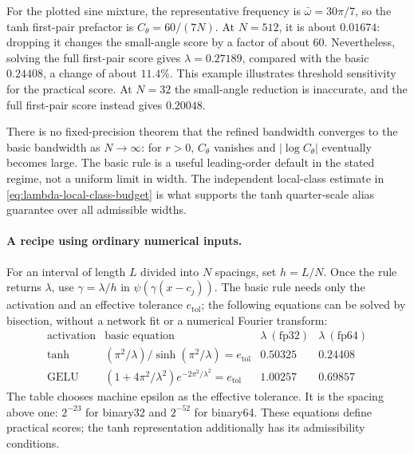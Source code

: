\documentclass[11pt]{article}
\begin{document}
For the plotted sine mixture, the representative frequency is
$\bar\omega=30\pi/7$, so the tanh first-pair prefactor is
$C_\theta=60/(7N)$. At $N=512$, it is about $0.01674$: dropping it
changes the small-angle score by a factor of about $60$. Nevertheless,
solving the full first-pair score gives $\lambda=0.27189$, compared with
the basic $0.24408$, a change of about $11.4\%$. This example illustrates
threshold sensitivity for the practical score. At $N=32$ the small-angle
reduction is inaccurate, and the full first-pair score instead gives
$0.20048$.

There is no fixed-precision theorem that the refined bandwidth converges
to the basic bandwidth as $N\to\infty$: for $r>0$, $C_\theta$ vanishes
and $|\log C_\theta|$ eventually becomes large. The basic rule is a useful
leading-order default in the stated regime, not a uniform limit in width.
The independent local-class estimate in
\eqref{eq:lambda-local-class-budget} is what supports the tanh quarter-scale
alias guarantee over all admissible widths.

\paragraph{A recipe using ordinary numerical inputs.}
For an interval of length $L$ divided into $N$ spacings, set $h=L/N$.
Once the rule returns $\lambda$, use $\gamma=\lambda/h$ in
$\psi(\gamma(x-c_j))$. The basic rule needs only the activation and
an effective tolerance $e_{\mathrm{tol}}$; the following equations can be solved by
bisection, without a network fit or a numerical Fourier transform:
\[
\begin{array}{c|c|c|c}
\text{activation}&\text{basic equation}&\lambda\ (\text{fp32})&\lambda\ (\text{fp64})\\\hline
\tanh& (\pi^2/\lambda)/\sinh(\pi^2/\lambda)=e_{\mathrm{tol}}&0.50325&0.24408\\
\mathrm{GELU}&(1+4\pi^2/\lambda^2)e^{-2\pi^2/\lambda^2}=e_{\mathrm{tol}}&1.00257&0.69857
\end{array}
\]
The table chooses machine epsilon as the effective tolerance. It is the spacing above one: $2^{-23}$ for binary32
and $2^{-52}$ for binary64. These equations define practical scores; the
tanh representation additionally has its admissibility conditions.
\end{document}

